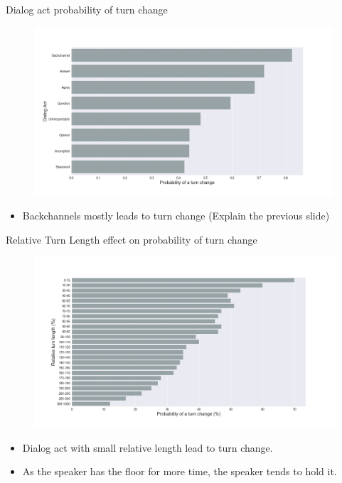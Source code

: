 \begin{frame}{Dialog act probability of turn change}
\begin{minipage}{0.8\textwidth}
\begin{figure}[H]
\centering
\includegraphics[width=30em]{../scikitlearn/figures/f2.png}\vspace{-1em}
\end{figure}
\end{minipage}
\begin{minipage}{0.8\textwidth}
\begin{itemize}
\item \small{Backchannels mostly leads to turn change (Explain the previous slide)}
\end{itemize}
\end{minipage}
\end{frame}



\begin{frame}{Relative Turn Length effect on probability of turn change}
\begin{minipage}{0.8\textwidth}
\begin{figure}[H]
\centering
\includegraphics[width=36em]{../scikitlearn/figures/f5.png}\vspace{-1em}
\end{figure}
\end{minipage}
\begin{minipage}{0.8\textwidth}
\begin{itemize}
\item \small{Dialog act with small relative length lead to turn change.}
\item \small{As the speaker has the floor for more time, the speaker tends to hold it.}
\end{itemize}
\end{minipage}
\end{frame}

